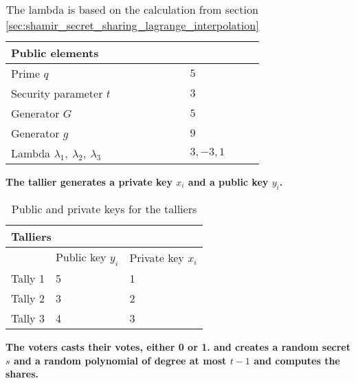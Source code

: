 \begin{table}[H]
\centering
\begin{tabular}{|l|l|}
\hline
\multicolumn{2}{|l|}{\textbf{Public elements}} \\ \hline
Prime $q$                       & $5$              \\ \hline
Security parameter $t$          & $3$              \\ \hline
Generator $G$                   & $5$              \\ \hline
Generator $g$                   & $9$              \\ \hline
Lambda  $\lambda_1, \ \lambda_2,\ \lambda_3$                      & $3,-3,1$         \\ \hline
\end{tabular}
\caption{The lambda is based on the calculation from section \ref{sec:shamir_secret_sharing_lagrange_interpolation} }
\label{my-label}
\end{table}

\noindent
\textbf{The tallier generates a private key $x_i$ and a public key $y_i$.}

\begin{table}[H]
\centering
\begin{tabular}{|l|l|l|}
\hline
\multicolumn{3}{|l|}{\textbf{Talliers}}        \\ \hline
\textbf{} & Public key $y_i$ & Private key $x_i$ \\ \hline
Tally 1 & 5               & 1                \\ \hline
Tally 2 & 3               & 2                \\ \hline
Tally 3 & 4               & 3                \\ \hline
\end{tabular}
\caption{Public and private keys for the talliers}
\label{my-label}
\end{table}

\noindent
\textbf{The voters casts their votes, either 0 or 1. and creates a random secret $s$ and a random polynomial of degree at most $t-1$ and computes the shares.}

